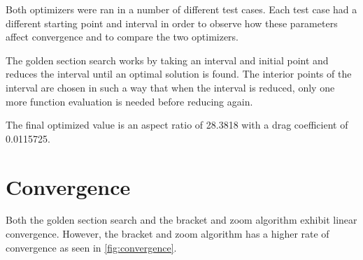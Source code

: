 \documentclass[12pt,parskip=full]{article}
\numberwithin{subsection}{section}
\begin{document}
		Both optimizers were ran in a number of different test cases. Each test case had a different starting point and interval
		in order to observe how these parameters affect convergence and to compare the two optimizers.
		
		The golden section search works by taking an interval and initial point and reduces the interval until an optimal solution is
		found. The interior points of the interval are chosen in such a way that when the interval is reduced, only one more function
		evaluation is needed before reducing again.
		
		The final optimized value is an aspect ratio of 28.3818 with a drag coefficient of 0.0115725.

	\section{Convergence}
	
		Both the golden section search and the bracket and zoom algorithm exhibit linear convergence. However, the bracket and zoom algorithm
		has a higher rate of convergence as seen in \cref{fig:convergence}.
		
\end{document}
